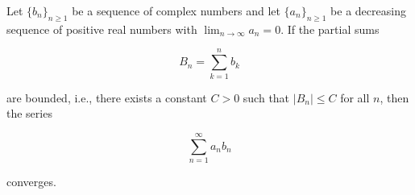 Let $\{b_n\}_{n \geq 1}$ be a sequence of complex numbers and let $\{a_n\}_{n \geq 1}$ be a decreasing sequence of positive real numbers with $\lim_{n \to \infty} a_n = 0$. If the partial sums

$$B_n = \sum_{k=1}^{n} b_k$$

are bounded, i.e., there exists a constant $C > 0$ such that $|B_n| \leq C$ for all $n$, then the series

$$\sum_{n=1}^{\infty} a_n b_n$$

converges.
